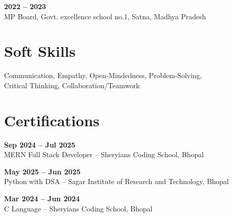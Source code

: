 \documentclass[a4paper,10pt]{article}
\begin{document}
\begin{minipage}[t]{0.33\textwidth}
\vspace{1mm}
\textbf{2022 -- 2023} \\
MP Board, Govt. excellence school no.1, Satna, Madhya Pradesh

\section*{Soft Skills}
Communication, Empathy, Open-Mindedness, Problem-Solving,\\
Critical Thinking, Collaboration/Teamwork

\section*{Certifications}
\textbf{Sep 2024 -- Jul 2025} \\
MERN Full Stack Developer -- Sheryians Coding School, Bhopal

\vspace{1mm}
\textbf{May 2025 -- Jun 2025} \\
Python with DSA -- Sagar Institute of Research and Technology, Bhopal

\vspace{1mm}
\textbf{Mar 2024 -- Jun 2024} \\
C Language -- Sheryians Coding School, Bhopal

\end{minipage}
\hfill
\end{document}

